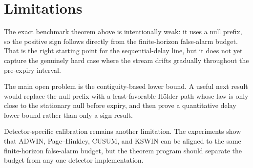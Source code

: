\section{Limitations}

The exact benchmark theorem above is intentionally weak: it uses a null prefix,
so the positive sign follows directly from the finite-horizon false-alarm budget.
That is the right starting point for the sequential-delay line, but it does not
yet capture the genuinely hard case where the stream drifts gradually throughout
the pre-expiry interval.

The main open problem is the contiguity-based lower bound. A useful next result
would replace the null prefix with a least-favorable H\"older path whose law is
only close to the stationary null before expiry, and then prove a quantitative
delay lower bound rather than only a sign result.

Detector-specific calibration remains another limitation. The experiments show
that ADWIN, Page--Hinkley, CUSUM, and KSWIN can be aligned to the same
finite-horizon false-alarm budget, but the theorem program should separate the
budget from any one detector implementation.
